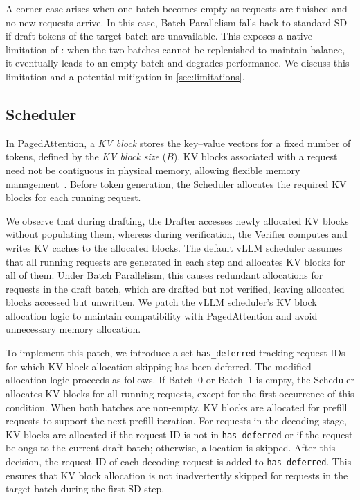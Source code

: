 A corner case arises when one batch becomes empty as requests are finished and no new requests arrive. In this case, Batch Parallelism falls back to standard SD if draft tokens of the target batch are unavailable. This exposes a native limitation of \alg{}: when the two batches cannot be replenished to maintain balance, it eventually leads to an empty batch and degrades performance. We discuss this limitation and a potential mitigation in \cref{sec:limitations}.


\subsection{Scheduler}
In PagedAttention, a \textit{KV block} stores the key–value vectors for a fixed number of tokens, defined by the \textit{KV block size} ($B$). KV blocks associated with a request need not be contiguous in physical memory, allowing flexible memory management~\citep{kwon2023vllm}. Before token generation, the Scheduler allocates the required KV blocks for each running request.


We observe that during drafting, the Drafter accesses newly allocated KV blocks without populating them, whereas during verification, the Verifier computes and writes KV caches to the allocated blocks. The default vLLM scheduler assumes that all running requests are generated in each step and allocates KV blocks for all of them. 
Under Batch Parallelism, this causes redundant allocations for requests in the draft batch, which are drafted but not verified, leaving allocated blocks accessed but unwritten.
We patch the vLLM scheduler's KV block allocation logic to maintain compatibility with PagedAttention and avoid unnecessary memory allocation.


To implement this patch, we introduce a set \texttt{has\_deferred} tracking request IDs for which KV block allocation skipping has been deferred. The modified allocation logic proceeds as follows. If Batch~$0$ or Batch~$1$ is empty, the Scheduler allocates KV blocks for all running requests, except for the first occurrence of this condition.
When both batches are non-empty, KV blocks are allocated for prefill requests to support the next prefill iteration. For requests in the decoding stage, KV blocks are allocated if the request ID is not in \texttt{has\_deferred} or if the request belongs to the current draft batch; otherwise, allocation is skipped.
After this decision, the request ID of each decoding request is added to \texttt{has\_deferred}. This ensures that KV block allocation is not inadvertently skipped for requests in the target batch during the first SD step.